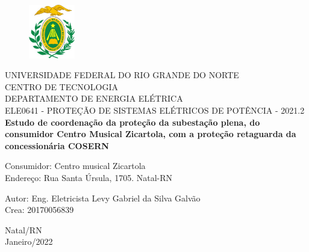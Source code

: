 \begin{titlepage}
	\begin{center}
	
	\begin{figure}[!ht]
	\centering
	\includegraphics[width=2cm]{images/ufrn.jpg}
	\end{figure}
		UNIVERSIDADE FEDERAL DO RIO GRANDE DO NORTE \\ CENTRO DE TECNOLOGIA \\ DEPARTAMENTO DE ENERGIA ELÉTRICA \\ ELE0641 - PROTEÇÃO DE SISTEMAS ELÉTRICOS DE POTÊNCIA - 2021.2 \\
		\vspace{15pt}
        \vspace{95pt}
        \textbf{\Large{Estudo de coordenação da proteção da subestação plena, do consumidor Centro Musical Zicartola, com a proteção retaguarda da concessionária COSERN}}\\
		\vspace{3,5cm}
	\end{center}
	
	\begin{flushleft}
	    \item Consumidor: Centro musical Zicartola \\ Endereço: Rua Santa Úrsula, 1705. Natal-RN
		\item Autor: Eng. Eletricista Levy Gabriel da Silva Galvão \\ Crea: 20170056839
 	\end{flushleft}
	\vspace{1cm}
	
	\begin{center}
		\vspace{\fill}
		Natal/RN \\ Janeiro/2022
	\end{center}
\end{titlepage}

\newpage

\newpage
\tableofcontents
\newpage